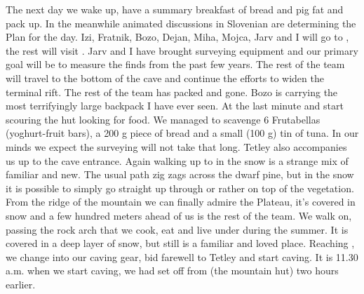 The next day we wake up, have a summary breakfast of bread and pig fat
and pack up. In the meanwhile animated discussions in Slovenian are
determining the Plan for the day. Izi, Fratnik, Bozo, Dejan, Miha,
Mojca, Jarv and I will go to , the rest will visit .
Jarv and I have brought surveying equipment and our primary goal will be
to measure the finds from the past few years. The rest of the team will
travel to the bottom of the cave and continue the efforts to widen the
terminal rift. The rest of the  team has packed and gone. Bozo
is carrying the most terrifyingly large backpack I have ever seen. At
the last minute  and start scouring the hut looking for food. We managed to
scavenge 6 Frutabellas (yoghurt-fruit bars), a 200 g piece of bread and
a small (100 g) tin of tuna. In our minds we expect the surveying will
not take that long. Tetley also accompanies us up to the cave entrance.
Again walking up to  in the snow is a strange mix of familiar and
new. The usual path zig zags across the dwarf pine, but in the snow it
is possible to simply go straight up through or rather on top of the
vegetation. From the ridge of the mountain we can finally admire the
Plateau, it's covered in snow and a few hundred meters ahead of us is
the rest of the team. We walk on, passing the rock arch that we cook, eat
and live under during the summer. It is covered in a deep layer of snow,
but still is a familiar and loved place. Reaching , we change
into our caving gear, bid farewell to Tetley and start caving. It is
11.30 a.m. when we start caving, we had set off from  (the mountain
hut) two hours earlier.


